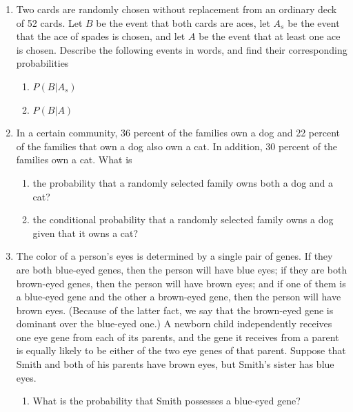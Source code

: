 \documentclass{article}
\begin{document}
\begin{enumerate}
    \begin{enumerate}
        \item an Independent?
        \item a Liberal?
        \item a Conservative?
        \item What percent of voters participated in the local election?
    \end{enumerate}
    \item Two cards are randomly chosen without replacement from an ordinary deck of 52 cards. Let $B$ be the event that both cards are aces, let $A_s$ be the event that the ace of spades is chosen, and let $A$ be the event that at least one ace is chosen. Describe the following events in words, and find their corresponding probabilities
    \begin{enumerate}
        \item $P(B|A_s)$
        \item $P(B|A)$
    \end{enumerate}
    \item In a certain community, 36 percent of the families own a dog and 22 percent of the families that own a dog also own a cat. In addition, 30 percent of the families own a cat. What is
    \begin{enumerate}
        \item the probability that a randomly selected family owns both a dog and a cat?
        \item the conditional probability that a randomly selected family owns a dog given that it owns a cat?
    \end{enumerate}
    \item The color of a person's eyes is determined by a single pair of genes. If they are both blue-eyed genes, then the person will have blue eyes; if they are both brown-eyed genes, then the person will have brown eyes; and if one of them is a blue-eyed gene and the other a brown-eyed gene, then the person will have brown eyes. (Because of the latter fact, we say that the brown-eyed gene is dominant over the blue-eyed one.) A newborn child independently receives one eye gene from each of its parents, and the gene it receives from a parent is equally likely to be either of the two eye genes of that parent. Suppose that Smith and both of his parents have brown eyes, but Smith's sister has blue eyes.
    \begin{enumerate}
        \item What is the probability that Smith possesses a blue-eyed gene?

\end{enumerate}
\end{enumerate}
\end{document}
